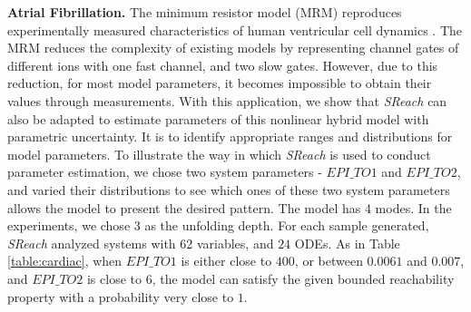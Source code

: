 {\bf\noindent Atrial Fibrillation.} The minimum resistor model (MRM) reproduces experimentally measured characteristics of human ventricular cell dynamics \cite{bueno2008minimal}. The MRM reduces the complexity of existing models by representing channel gates of different ions with one fast channel, and two slow gates. However, due to this reduction, for most model parameters, it becomes impossible to obtain their values through measurements. With this application, we show that {\it SReach} can also be adapted to estimate parameters of this nonlinear hybrid model with parametric uncertainty. It is to identify appropriate ranges and distributions for model parameters. To illustrate the way in which {\it SReach} is used to conduct parameter estimation, we chose two system parameters - $EPI\_TO1$ and $EPI\_TO2$, and varied their distributions to see which ones of these two system parameters allows the model to present the desired pattern. The model has 4 modes. In the experiments, we chose $3$ as the unfolding depth. For each sample generated, {\it SReach} analyzed systems with $62$ variables, and $24$ ODEs. As in Table \ref{table:cardiac}, when $EPI\_TO1$ is either close to $400$, or between $0.0061$ and $0.007$, and $EPI\_TO2$ is close to $6$, the model can satisfy the given bounded reachability property with a probability very close to $1$. 
\vspace{-.1cm}

